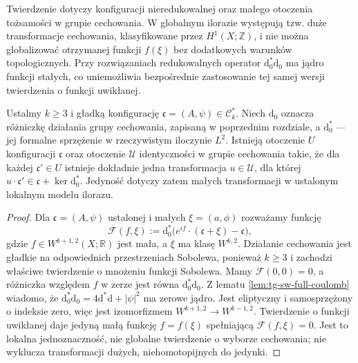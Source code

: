 \begin{uwaga}
Twierdzenie dotyczy konfiguracji nieredukowalnej oraz
małego otoczenia tożsamości w grupie cechowania.
W globalnym ilorazie występują tzw. duże transformacje
cechowania, klasyfikowane przez $H^1(X;\mathbb Z)$,
i nie można globalizować otrzymanej funkcji $f(\xi)$
bez dodatkowych warunków topologicznych.
Przy rozwiązaniach redukowalnych operator
$\mathrm d_0^*\mathrm d_0$ ma jądro funkcji stałych,
co uniemożliwia bezpośrednie zastosowanie tej samej
wersji twierdzenia o funkcji uwikłanej.
\end{uwaga}

\begin{twierdzenie}
\label{thm:tg-sw12-slice}
Ustalmy $k\ge3$ i gładką konfigurację
$\mathfrak c=(A,\psi)\in\mathcal C_k^*$.
Niech $\mathrm d_0$ oznacza różniczkę działania grupy
cechowania, zapisaną w poprzednim rozdziale, a
$\mathrm d_0^*$ --- jej formalne sprzężenie w rzeczywistym
iloczynie $L^2$. Istnieją otoczenie $U$ konfiguracji $\mathfrak c$ oraz
otoczenie $\mathcal U$ identyczności w grupie cechowania
takie, że dla każdej $\mathfrak c'\in U$ istnieje
dokładnie jedna transformacja $u\in\mathcal U$,
dla której $u\cdot\mathfrak c'\in
\mathfrak c+\ker\mathrm d_0^*$.
Jedyność dotyczy zatem małych transformacji
w ustalonym lokalnym modelu ilorazu.
\end{twierdzenie}

\begin{proof}
Dla $\mathfrak c=(A,\psi)$ ustalonej i małych
$\xi=(a,\phi)$ rozważamy funkcję
\[
\mathcal F(f,\xi):=\mathrm d_0^*
\bigl(e^{if}\cdot(\mathfrak c+\xi)-\mathfrak c\bigr),
\]
gdzie $f\in W^{k+1,2}(X;\mathbb R)$ jest mała, a $\xi$
ma klasę $W^{k,2}$. Działanie cechowania jest gładkie
na odpowiednich przestrzeniach Sobolewa, ponieważ $k\ge3$
i zachodzi właściwe twierdzenie o mnożeniu funkcji Sobolewa.
Mamy $\mathcal F(0,0)=0$, a różniczka względem $f$
w zerze jest równa $\mathrm d_0^*\mathrm d_0$.
Z lematu \ref{lem:tg-sw-full-coulomb} wiadomo, że
$\mathrm d_0^*\mathrm d_0=4\mathrm d^*\mathrm d+|\psi|^2$
ma zerowe jądro. Jest eliptyczny i samosprzężony o indeksie
zero, więc jest izomorfizmem
$W^{k+1,2}\to W^{k-1,2}$.
Twierdzenie o funkcji uwikłanej daje jedyną małą funkcję
$f=f(\xi)$ spełniającą $\mathcal F(f,\xi)=0$.
Jest to lokalna jednoznaczność, nie globalne twierdzenie
o wyborze cechowania; nie wyklucza transformacji dużych,
niehomotopijnych do jedynki.
\end{proof}

